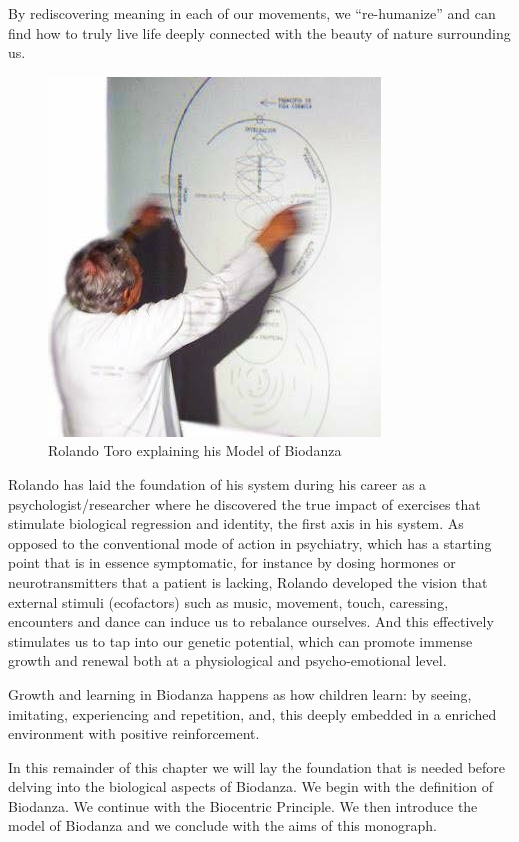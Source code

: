\documentclass[
  11pt,
]{book}
\begin{document}
By rediscovering meaning in each of our movements, we ``re-humanize'' and can find how to truly live life deeply connected with the beauty of nature surrounding us.

\begin{figure}

{\centering \includegraphics[width=0.45\linewidth]{./figs/rolandoAndModel} 

}

\caption{Rolando Toro explaining his Model of Biodanza}\label{fig:rolandoModel}
\end{figure}

Rolando has laid the foundation of his system during his career as a psychologist/researcher where he discovered the true impact of exercises that stimulate biological regression and identity, the first axis in his system. As opposed to the conventional mode of action in psychiatry, which has a starting point that is in essence symptomatic, for instance by dosing hormones or neurotransmitters that a patient is lacking, Rolando developed the vision that external stimuli (ecofactors) such as music, movement, touch, caressing, encounters and dance can induce us to rebalance ourselves. And this effectively stimulates us to tap into our genetic potential, which can promote immense growth and renewal both at a physiological and psycho-emotional level.

Growth and learning in Biodanza happens as how children learn: by seeing, imitating, experiencing and repetition, and, this deeply embedded in a enriched environment with positive reinforcement.

In this remainder of this chapter we will lay the foundation that is needed before delving into the biological aspects of Biodanza. We begin with the definition of Biodanza. We continue with the Biocentric Principle. We then introduce the model of Biodanza and we conclude with the aims of this monograph.
\end{document}
